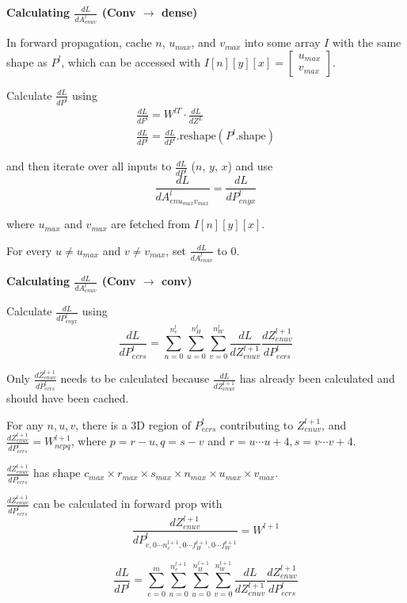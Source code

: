 \documentclass[12pt]{article}
\begin{document}
\textbf{Calculating $\frac{dL}{dA^l_{enuv}}$ (Conv $\rightarrow$ dense)}

In forward propagation, cache $n$, $u_{max}$, and $v_{max}$ into some array $I$ with the same
shape as $P^l$, which can be accessed with $I[n][y][x] = \begin{bmatrix}u_{max}\\v_{max}
\end{bmatrix}$.

Calculate $\frac{dL}{dP^l}$ using
\begin{gather*}
    \frac{dL}{dF^l} = W^{l T} \cdot \frac{dL}{dZ^L}\\
    \frac{dL}{dP^l} = \frac{dL}{dF^l}\text{.reshape}(P^l\text{.shape})
\end{gather*}

and then iterate over all inputs to $\frac{dL}{dP^l}$ ($n$, $y$, $x$) and use
\[ \frac{dL}{dA^l_{enu_{max}v_{max}}} = \frac{dL}{dP^l_{enyx}} \]

where $u_{max}$ and $v_{max}$ are fetched from $I[n][y][x]$.

For every $u \ne u_{max}$ and $v \ne v_{max}$, set $\frac{dL}{dA^l_{enuv}}$ to 0.

\textbf{Calculating $\frac{dL}{dA^l_{enuv}}$ (Conv $\rightarrow$ conv)}

Calculate $\frac{dL}{dP^l_{enyx}}$ using
\[ \frac{dL}{dP^l_{ecrs}} = \sum_{n=0}^{n_c^l} \sum_{u=0}^{n_H^l} \sum_{v=0}^{n_W^l}
\frac{dL}{dZ^{l+1}_{enuv}} \frac{dZ^{l+1}_{enuv}}{dP^l_{ecrs}} \]

Only $\frac{dZ^{l+1}_{enuv}}{dP^l_{ecrs}}$ needs to be calculated because $\frac{dL}{dZ^{l+1}_{enuv}}$
has already been calculated and should have been cached.

For any $n, u, v$, there is a 3D region of $P^l_{ecrs}$ contributing to $Z^{l+1}_{enuv}$, and
$\frac{dZ^{l+1}_{enuv}}{dP^{l}_{ecrs}} = W^{l+1}_{ncpq}$, where $p = r-u, q = s-v$ and $r = u
\cdots u+4, s = v \cdots v + 4$.

$\frac{dZ^{l+1}_{enuv}}{dP^{l}_{ecrs}}$ has shape $c_{max} \times r_{max} \times s_{max}
\times n_{max} \times u_{max} \times v_{max}$.

$\frac{dZ^{l+1}_{enuv}}{dP^{l}_{ecrs}}$ can be calculated in forward prop with
\[ \frac{dZ^{l+1}_{enuv}}{dP^l_{e,0\cdots n^{l+1}_c,0\cdots f_H^{l+1},0 \cdots f_W^{l+1}}}
= W^{l+1}\]

\[ \frac{dL}{dP^{l}} = \sum_{e=0}^m \sum_{n=0}^{n_c^{l+1}} \sum_{u=0}^{n_H^{l+1}} \sum_{v=0}^{n_W^{l+1}}
\frac{dL}{dZ^{l+1}_{enuv}} \frac{dZ^{l+1}_{enuv}}{dP^{l}_{ecrs}} \]
\end{document}
